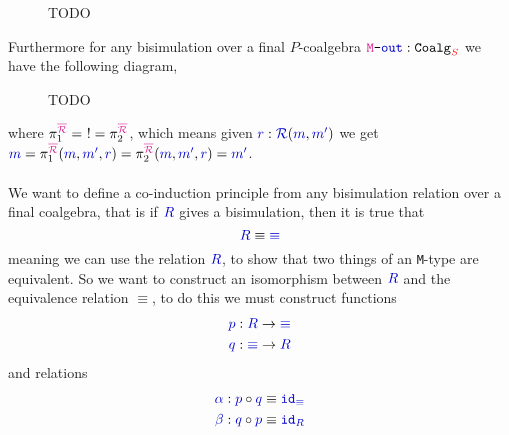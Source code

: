 \documentclass[twoside,11pt,openright]{report}
\newcommand*{\term}[1]{\textcolor{blue!80!black}{#1}}
\newcommand*{\type}[1]{\textcolor{magenta!90!black}{#1}}
\newcommand*{\container}[1]{\textcolor{red}{#1}}
\newcommand*{\coalg}[2]{#1\texttt{-}#2}
\begin{document}
\begin{figure}[h]
  \centering
  \caption{TODO}
\end{figure}
\noindent Furthermore for any bisimulation over a final \(P\)-coalgebra \(\coalg{\type{\mathtt{M}}}{\term{\mathtt{out}}}:\mathtt{Coalg}_{\container{S}}\) we have the following diagram,

\begin{figure}[h]
  \centering
  \caption{TODO}
\end{figure}
\noindent where \(\pi_1^{\type{\overline{\mathcal{R}}}} = ~! = \pi_2^{\type{\overline{\mathcal{R}}}}\), which means given \(\term{r} : \term{\mathcal{R}}(\term{m},\term{m'})\) we get \(\term{m} = \pi_1^{\type{\overline{\mathcal{R}}}} (\term{m}, \term{m'}, \term{r}) = \pi_2^{\type{\overline{\mathcal{R}}}} (\term{m}, \term{m'}, \term{r}) = \term{m'}\).
\\ \\
We want to define a co-induction principle from any bisimulation relation over a final coalgebra, that is if \(\term{R}\) gives a bisimulation, then it is true that
\begin{equation}
  \term{R} \equiv \term{\equiv}
\end{equation}
meaning we can use the relation \(\term{R}\), to show that two things of an \texttt{M}-type are equivalent. So we want to construct an isomorphism between \(\term{R}\) and the equivalence relation \(\equiv\), to do this we must construct functions
\begin{align}
  \term{p} &: \term{R} \rightarrow \term{\equiv} \\
  \term{q} &: \term{\equiv} \rightarrow \term{R}
\end{align}
and relations
\begin{align}
  \term{\alpha} &: \term{p} \circ \term{q} \equiv \term{\mathtt{id}_{\equiv}} \\
  \term{\beta} &: \term{q} \circ \term{p} \equiv \term{\mathtt{id}_{R}}
\end{align}
\end{document}

